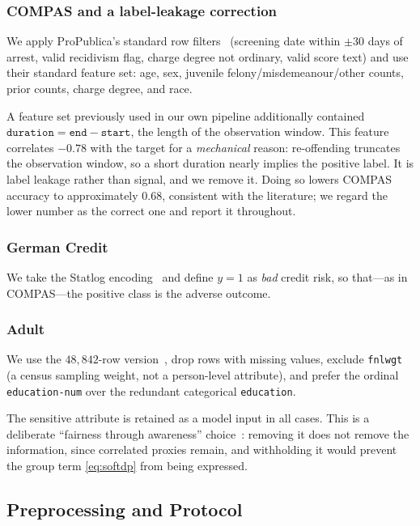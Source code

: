 \subsubsection{COMPAS and a label-leakage correction}
We apply ProPublica's standard row filters~\cite{angwin2016machine}
(screening date within $\pm 30$ days of arrest, valid recidivism flag,
charge degree not ordinary, valid score text) and use their standard feature
set: age, sex, juvenile felony/misdemeanour/other counts, prior counts, charge
degree, and race.

A feature set previously used in our own pipeline additionally contained
$\texttt{duration} = \texttt{end} - \texttt{start}$, the length of the
observation window. This feature correlates $-0.78$ with the target for a
\emph{mechanical} reason: re-offending truncates the observation window, so a
short duration nearly implies the positive label. It is label leakage rather
than signal, and we remove it. Doing so lowers COMPAS accuracy to
approximately $0.68$, consistent with the literature; we regard the lower
number as the correct one and report it throughout.

\subsubsection{German Credit}
We take the Statlog encoding~\cite{hofmann1994statlog} and define $y=1$ as
\emph{bad} credit risk, so that---as in COMPAS---the positive class is the
adverse outcome.

\subsubsection{Adult}
We use the $48{,}842$-row version~\cite{uci2017adult}, drop rows with missing
values, exclude
\texttt{fnlwgt} (a census sampling weight, not a person-level attribute), and
prefer the ordinal \texttt{education-num} over the redundant categorical
\texttt{education}.

The sensitive attribute is retained as a model input in all cases. This is a
deliberate ``fairness through awareness'' choice~\cite{dwork2012fairness}:
removing it does not remove the information, since correlated proxies remain,
and withholding it would prevent the group term \eqref{eq:softdp} from being
expressed.

\subsection{Preprocessing and Protocol}

